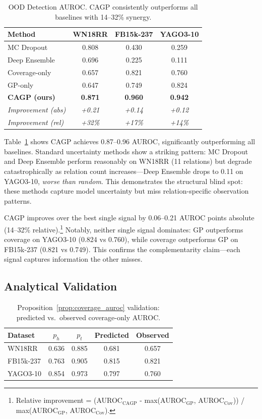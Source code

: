 \begin{table}[t]
\centering
\caption{OOD Detection AUROC. CAGP consistently outperforms all baselines with 14--32\% synergy.}
\label{tab:main}
\vspace{0.5em}
\begin{tabular}{lccc}
\toprule
Method & WN18RR & FB15k-237 & YAGO3-10 \\
\midrule
MC Dropout & 0.808 & 0.430 & 0.259 \\
Deep Ensemble & 0.696 & 0.225 & 0.111 \\
Coverage-only & 0.657 & 0.821 & 0.760 \\
GP-only & 0.647 & 0.749 & 0.824 \\
\midrule
\textbf{CAGP (ours)} & \textbf{0.871} & \textbf{0.960} & \textbf{0.942} \\
\midrule
\emph{Improvement (abs)} & \emph{+0.21} & \emph{+0.14} & \emph{+0.12} \\
\emph{Improvement (rel)} & \emph{+32\%} & \emph{+17\%} & \emph{+14\%} \\
\bottomrule
\end{tabular}
\end{table}

Table~\ref{tab:main} shows CAGP achieves 0.87--0.96 AUROC, significantly outperforming all baselines.
Standard uncertainty methods show a striking pattern: MC Dropout and Deep Ensemble perform reasonably on WN18RR (11 relations) but degrade catastrophically as relation count increases---Deep Ensemble drops to 0.11 on YAGO3-10, \emph{worse than random}.
This demonstrates the structural blind spot: these methods capture model uncertainty but miss relation-specific observation patterns.

CAGP improves over the best single signal by 0.06--0.21 AUROC points absolute (14--32\% relative).\footnote{Relative improvement = (AUROC$_{\text{CAGP}}$ - max(AUROC$_{\text{GP}}$, AUROC$_{\text{Cov}}$)) / max(AUROC$_{\text{GP}}$, AUROC$_{\text{Cov}}$).}
Notably, neither single signal dominates: GP outperforms coverage on YAGO3-10 (0.824 vs 0.760), while coverage outperforms GP on FB15k-237 (0.821 vs 0.749).
This confirms the complementarity claim---each signal captures information the other misses.

\subsection{Analytical Validation}

\begin{table}[t]
\centering
\caption{Proposition~\ref{prop:coverage_auroc} validation: predicted vs.\ observed coverage-only AUROC.}
\label{tab:theorem}
\vspace{0.5em}
\begin{tabular}{lcccc}
\toprule
Dataset & $p_h$ & $p_t$ & Predicted & Observed \\
\midrule
WN18RR & 0.636 & 0.885 & 0.681 & 0.657 \\
FB15k-237 & 0.763 & 0.905 & 0.815 & 0.821 \\
YAGO3-10 & 0.854 & 0.973 & 0.797 & 0.760 \\
\bottomrule
\end{tabular}
\end{table}


